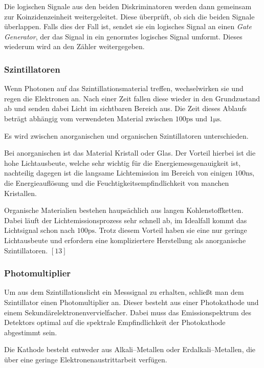 \documentclass[12pt,a4paper]{scrartcl}
\numberwithin{equation}{section} %
\newcommand{\pu}[1]{\ensuremath{\mathrm{#1}}}
\renewcommand{\[}{} %
\renewcommand{\]}{\noindent} %
\begin{document}
Die logischen Signale aus den beiden Diskriminatoren werden dann
gemeinsam zur Koinzidenzeinheit weitergeleitet. Diese überprüft, ob sich
die beiden Signale überlappen. Falls dies der Fall ist, sendet sie ein
logisches Signal an einen \emph{Gate Generator}, der das Signal in ein
genormtes logisches Signal umformt. Dieses wiederum wird an den Zähler
weitergegeben.

\hypertarget{szintillatoren}{%
\subsubsection{Szintillatoren}\label{szintillatoren}}

Wenn Photonen auf das Szintillationsmaterial treffen, wechselwirken sie
und regen die Elektronen an. Nach einer Zeit fallen diese wieder in den
Grundzustand ab und senden dabei Licht im sichtbaren Bereich aus. Die
Zeit dieses Ablaufs beträgt abhängig vom verwendeten Material zwischen
\(\pu{100 ps}\) und \(\pu{1\mu s}\).

Es wird zwischen anorganischen und organischen Szintillatoren
unterschieden.

Bei anorganischen ist das Material Kristall oder Glas. Der Vorteil
hierbei ist die hohe Lichtausbeute, welche sehr wichtig für die
Energiemessgenauigkeit ist, nachteilig dagegen ist die langsame
Lichtemission im Bereich von einigen \(\pu{100 ns}\), die
Energieauflösung und die Feuchtigkeitsempfindlichkeit von manchen
Kristallen.

Organische Materialien bestehen haupsächlich aus langen
Kohlenstoffketten. Dabei läuft der Lichtemissionsprozess sehr schnell
ab, im Idealfall kommt das Lichtsignal schon nach \(\pu{100 ps}\). Trotz
diesem Vorteil haben sie eine nur geringe Lichtausbeute und erfordern
eine kompliziertere Herstellung als anorganische Szintillatoren.
\([13]\)

\hypertarget{photomultiplier}{%
\subsubsection{Photomultiplier}\label{photomultiplier}}

Um aus dem Szintillationslicht ein Messsignal zu erhalten, schließt man
dem Szintillator einen Photomultiplier an. Dieser besteht aus einer
Photokathode und einem Sekundärelektronenvervielfacher. Dabei muss das
Emissionspektrum des Detektors optimal auf die spektrale Empfindlichkeit
der Photokathode abgestimmt sein.

Die Kathode besteht entweder aus Alkali--Metallen oder
Erdalkali--Metallen, die über eine geringe Elektronenaustrittarbeit
verfügen.
\end{document}
